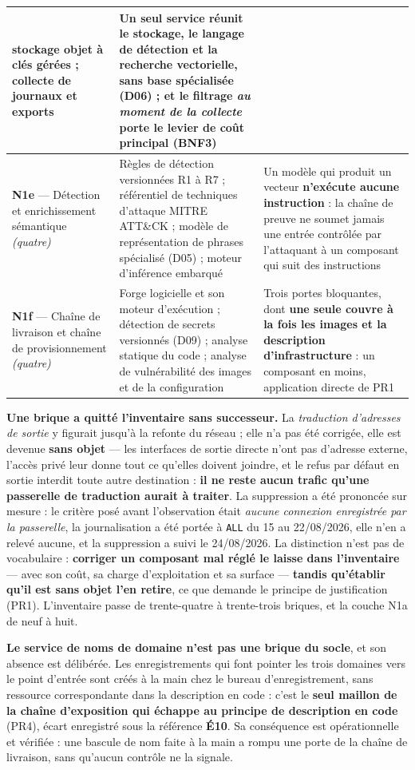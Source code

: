 \begin{longtable}{|P{2.7cm}|P{6.3cm}|P{6.1cm}|}
stockage objet à clés gérées ; collecte de journaux et exports &
Un seul service réunit le stockage, le langage de détection et la recherche vectorielle, sans base
spécialisée (D06) ; et le filtrage \emph{au moment de la collecte} porte le levier de coût
principal (BNF3) \\ \hline
\textbf{N1e} --- Détection et enrichissement sémantique \emph{(quatre)} &
Règles de détection versionnées R1 à R7 ; référentiel de techniques d'attaque MITRE ATT\&CK ;
modèle de représentation de phrases spécialisé (D05) ; moteur d'inférence embarqué &
Un modèle qui produit un vecteur \textbf{n'exécute aucune instruction} : la chaîne de preuve ne
soumet jamais une entrée contrôlée par l'attaquant à un composant qui suit des instructions \\
\hline
\textbf{N1f} --- Chaîne de livraison et chaîne de provisionnement \emph{(quatre)} &
Forge logicielle et son moteur d'exécution ; détection de secrets versionnés (D09) ; analyse
statique du code ; analyse de vulnérabilité des images et de la configuration &
Trois portes bloquantes, dont \textbf{une seule couvre à la fois les images et la description
d'infrastructure} : un composant en moins, application directe de PR1 \\
\hline
\end{longtable}
\endgroup


\textbf{Une brique a quitté l'inventaire sans successeur.} La \emph{traduction d'adresses de
sortie} y figurait jusqu'à la refonte du réseau ; elle n'a pas été corrigée, elle est devenue
\textbf{sans objet} --- les interfaces de sortie directe n'ont pas d'adresse externe, l'accès
privé leur donne tout ce qu'elles doivent joindre, et le refus par défaut en sortie interdit toute
autre destination : \textbf{il ne reste aucun trafic qu'une passerelle de traduction aurait à
traiter}. La suppression a été prononcée sur mesure : le critère posé avant l'observation était
\emph{aucune connexion enregistrée par la passerelle}, la journalisation a été portée à
\texttt{ALL} du 15 au 22/08/2026, elle n'en a relevé aucune, et la suppression a suivi le
24/08/2026. La distinction n'est pas de vocabulaire : \textbf{corriger un composant mal réglé le
laisse dans l'inventaire} --- avec son coût, sa charge d'exploitation et sa surface ---
\textbf{tandis qu'établir qu'il est sans objet l'en retire}, ce que demande le principe de
justification (PR1). L'inventaire passe de trente-quatre à trente-trois briques, et la couche N1a
de neuf à huit.

\textbf{Le service de noms de domaine n'est pas une brique du socle}, et son absence est
délibérée. Les enregistrements qui font pointer les trois domaines vers le point d'entrée sont
créés à la main chez le bureau d'enregistrement, sans ressource correspondante dans la
description en code : c'est le \textbf{seul maillon de la chaîne d'exposition qui échappe au
principe de description en code} (PR4), écart enregistré sous la référence \textbf{É10}. Sa
conséquence est opérationnelle et vérifiée : une bascule de nom faite à la main a rompu une porte
de la chaîne de livraison, sans qu'aucun contrôle ne la signale.


